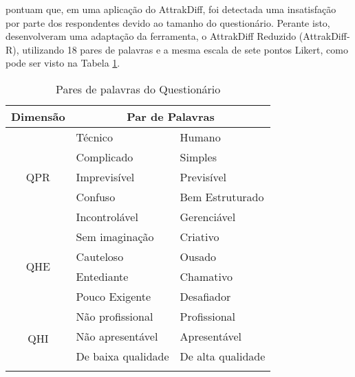  pontuam que, em uma aplicação do AttrakDiff, foi detectada uma insatisfação por parte dos respondentes devido ao tamanho 
do questionário. Perante isto, desenvolveram uma adaptação da ferramenta, o AttrakDiff Reduzido (AttrakDiff-R), utilizando 18 pares de palavras e a mesma 
escala de sete pontos Likert, como pode ser visto na Tabela \ref{tab02}.

\begin{table}[h]
    \centering
    \caption{Pares de palavras do Questionário}
    \label{tab02}
    \begin{tabular}{|c|ll|}
    \hline
    \textbf{Dimensão}             & \multicolumn{2}{c|}{\textbf{Par de Palavras}}                                 \\ \hline
    \multirow{5}{*}{QPR} & \multicolumn{1}{l|}{Técnico}                 & Humano                \\ \cline{2-3} 
                         & \multicolumn{1}{l|}{Complicado}              & Simples               \\ \cline{2-3} 
                         & \multicolumn{1}{l|}{Imprevisível}            & Previsível            \\ \cline{2-3} 
                         & \multicolumn{1}{l|}{Confuso}                 & Bem Estruturado       \\ \cline{2-3} 
                         & \multicolumn{1}{l|}{Incontrolável}           & Gerenciável           \\ \hline
    \multirow{4}{*}{QHE} & \multicolumn{1}{l|}{Sem imaginação}          & Criativo              \\ \cline{2-3} 
                         & \multicolumn{1}{l|}{Cauteloso}               & Ousado                \\ \cline{2-3} 
                         & \multicolumn{1}{l|}{Entediante}              & Chamativo             \\ \cline{2-3} 
                         & \multicolumn{1}{l|}{Pouco Exigente}          & Desafiador            \\ \hline
    \multirow{5}{*}{QHI} & \multicolumn{1}{l|}{Não profissional}        & Profissional          \\ \cline{2-3} 
                         & \multicolumn{1}{l|}{Não apresentável}        & Apresentável          \\ \cline{2-3} 
                         & \multicolumn{1}{l|}{De baixa qualidade}      & De alta qualidade     \\ \cline{2-3} 

\end{tabular}
\end{table}
